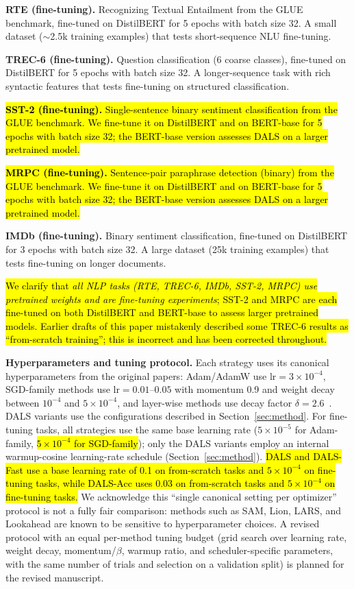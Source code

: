 \documentclass[a4paper,fleqn]{cas-dc}
\begin{document}
\textbf{RTE (fine-tuning).} Recognizing Textual Entailment from the GLUE benchmark, fine-tuned on DistilBERT for 5 epochs with batch size 32. A small dataset ($\sim$2.5k training examples) that tests short-sequence NLU fine-tuning.

\textbf{TREC-6 (fine-tuning).} Question classification (6 coarse classes), fine-tuned on DistilBERT for 5 epochs with batch size 32. A longer-sequence task with rich syntactic features that tests fine-tuning on structured classification.

\hl{\textbf{SST-2 (fine-tuning).} Single-sentence binary sentiment classification from the GLUE benchmark. We fine-tune it on DistilBERT and on BERT-base for 5 epochs with batch size 32; the BERT-base version assesses DALS on a larger pretrained model.}

\hl{\textbf{MRPC (fine-tuning).} Sentence-pair paraphrase detection (binary) from the GLUE benchmark. We fine-tune it on DistilBERT and on BERT-base for 5 epochs with batch size 32; the BERT-base version assesses DALS on a larger pretrained model.}

\textbf{IMDb (fine-tuning).} Binary sentiment classification, fine-tuned on DistilBERT for 3 epochs with batch size 32. A large dataset (25k training examples) that tests fine-tuning on longer documents.

\hl{We clarify that \emph{all NLP tasks (RTE, TREC-6, IMDb, SST-2, MRPC) use pretrained weights and are fine-tuning experiments}; SST-2 and MRPC are each fine-tuned on both DistilBERT and BERT-base to assess larger pretrained models. Earlier drafts of this paper mistakenly described some TREC-6 results as ``from-scratch training''; this is incorrect and has been corrected throughout.}

\textbf{Hyperparameters and tuning protocol.}\label{sec:hp_protocol} Each strategy uses its canonical hyperparameters from the original papers: Adam/AdamW use $\text{lr}=3\times10^{-4}$, SGD-family methods use $\text{lr}=0.01$--$0.05$ with momentum 0.9 and weight decay between $10^{-4}$ and $5\times10^{-4}$, and layer-wise methods use decay factor $\delta=2.6$~\citet{howard2018ulmfit}. DALS variants use the configurations described in Section~\ref{sec:method}. For fine-tuning tasks, all strategies use the same base learning rate ($5\times10^{-5}$ for Adam-family, \hl{$5\times10^{-4}$ for SGD-family}); only the DALS variants employ an internal warmup-cosine learning-rate schedule (Section~\ref{sec:method}). \hl{DALS and DALS-Fast use a base learning rate of 0.1 on from-scratch tasks and $5\times10^{-4}$ on fine-tuning tasks, while DALS-Acc uses 0.03 on from-scratch tasks and $5\times10^{-4}$ on fine-tuning tasks.} We acknowledge this ``single canonical setting per optimizer'' protocol is not a fully fair comparison: methods such as SAM, Lion, LARS, and Lookahead are known to be sensitive to hyperparameter choices. A revised protocol with an equal per-method tuning budget (grid search over learning rate, weight decay, momentum/$\beta$, warmup ratio, and scheduler-specific parameters, with the same number of trials and selection on a validation split) is planned for the revised manuscript.
\end{document}
